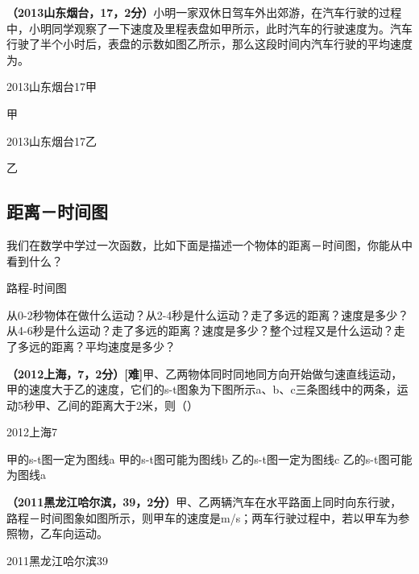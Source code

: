 \documentclass[12pt]{exam}%
\begin{document}
\begin{knowledge}
\textbf{（2013山东烟台，17，2分）}小明一家双休日驾车外出郊游，在汽车行驶的过程中，小明同学观察了一下速度及里程表盘如甲所示，此时汽车的行驶速度为\answerline*[80km/h]。汽车行驶了半个小时后，表盘的示数如图乙所示，那么这段时间内汽车行驶的平均速度为\answerline*[80km/h]。

\begin{multicols}{2}
\begin{linefig}[0.8]{2013山东烟台17甲}
\caption{甲}
\end{linefig}
\columnbreak
\begin{linefig}[0.8]{2013山东烟台17乙}
\caption{乙}
\end{linefig}
\end{multicols}


\subsection{距离－时间图}
我们在数学中学过一次函数，比如下面是描述一个物体的距离－时间图，你能从中看到什么？
\begin{fig}{路程-时间图}
\end{fig}


从0-2秒物体在做什么运动？从2-4秒是什么运动？走了多远的距离？速度是多少？从4-6秒是什么运动？走了多远的距离？速度是多少？整个过程又是什么运动？走了多远的距离？平均速度是多少？

\textbf{（2012上海，7，2分）[难]}甲、乙两物体同时同地同方向开始做匀速直线运动，甲的速度大于乙的速度，它们的s-t图象为下图所示a、b、c三条图线中的两条，运动5秒甲、乙间的距离大于2米，则（\answerline*[A]）
\pagebreak
\begin{multicols}{2}
\begin{linefig}[0.9]{2012上海7}
\end{linefig}
\begin{choices}
\choice 甲的s-t图一定为图线a 
\choice 甲的s-t图可能为图线b  
\choice 乙的s-t图一定为图线c  
\choice 乙的s-t图可能为图线a
\end{choices}
\end{multicols}

\begin{multicols}{2}
\textbf{（2011黑龙江哈尔滨，39，2分）}甲、乙两辆汽车在水平路面上同时向东行驶，路程－时间图象如图所示，则甲车的速度是\answerline*[15]m/s；两车行驶过程中，若以甲车为参照物，乙车向\answerline*[西]运动。                      
\columnbreak
\begin{linefig}{2011黑龙江哈尔滨39}
\end{linefig}
\end{multicols}


\end{knowledge}
\end{document}
